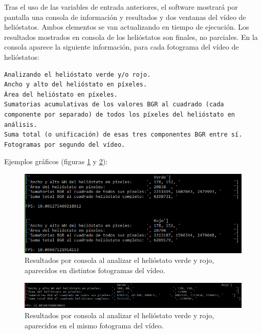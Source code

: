 Tras el uso de las variables de entrada anteriores, el software mostrará por pantalla una consola de información y resultados y dos ventanas del vídeo de helióstatos. Ambos elementos se van actualizando en tiempo de ejecución. Los resultados mostrados en consola de los helióstatos son finales, no parciales. En la consola aparece la siguiente información, para cada fotograma del vídeo de helióstatos:

\begin{lstlisting}
Analizando el helióstato verde y/o rojo.
Ancho y alto del helióstato en píxeles.
Área del helióstato en píxeles.
Sumatorias acumulativas de los valores BGR al cuadrado (cada componente por separado) de todos los píxeles del helióstato en análisis.
Suma total (o unificación) de esas tres componentes BGR entre sí.
Fotogramas por segundo del vídeo.
\end{lstlisting}

Ejemplos gráficos (figuras \ref{fig:CapturasEntradasYSalidas/Captura(2).PNG} y \ref{fig:CapturasEntradasYSalidas/Captura(3).PNG}):

\begin{figure}[h!]
  	\centering
	\includegraphics[width=\textwidth]{CapturasEntradasYSalidas/Captura(2).PNG}
	\caption{Resultados por consola al analizar el helióstato verde y rojo, aparecidos en distintos fotogramas del vídeo.
	\label{fig:CapturasEntradasYSalidas/Captura(2).PNG}}
\end{figure}

\begin{figure}[h!]
  	\centering
	\includegraphics[width=\textwidth]{CapturasEntradasYSalidas/Captura(3).PNG}
	\caption{Resultados por consola al analizar el helióstato verde y rojo, aparecidos en el mismo fotograma del vídeo.
	\label{fig:CapturasEntradasYSalidas/Captura(3).PNG}}
\end{figure}

